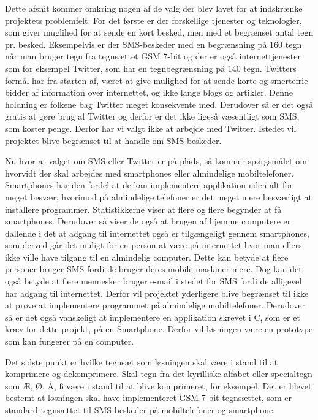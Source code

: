 Dette afsnit kommer omkring nogen af de valg der blev lavet for at indskrænke projektets problemfelt. For det første er der forskellige tjenester og teknologier, som giver muglihed for at sende en kort besked, men med et begrænset antal tegn pr. besked. Eksempelvis er der SMS-beskeder med en begrænsning på 160 tegn når man bruger tegn fra tegnsættet GSM 7-bit\cite{Pro_1} og der er også internettjenester som for eksempel Twitter, som har en tegnbegrænsning på 140 tegn\cite{pro_af1}. Twitters formål har fra starten af, været at give mulighed for at sende korte og smertefrie bidder af information over internettet, og ikke lange blogs og artikler. Denne holdning er folkene bag Twitter meget konsekvente med\cite{pro_af2}. Derudover så er det også gratis at gøre brug af Twitter og derfor er det ikke ligeså væsentligt som SMS, som koster penge. Derfor har vi valgt ikke at arbejde med Twitter. Istedet vil projektet blive begrænset til at handle om SMS-beskeder.

Nu hvor at valget om SMS eller Twitter er på plads, så kommer spørgsmålet om hvorvidt der skal arbejdes med smartphones eller almindelige mobiltelefoner. Smartphones har den fordel at de kan implementere applikation uden alt for meget besvær, hvorimod på almindelige telefoner er det meget mere besværligt at installere programmer. Statistikkerne viser at flere og flere begynder at få smartphones. Derudover så viser de også at brugen af hjemme computere er dallende i det at adgang til internettet også er tilgængeligt gennem smartphones, som derved går det muligt for en person at være på internettet hvor man ellers ikke ville have tilgang til en almindelig computer\cite{pro_af3}. Dette kan betyde at flere personer bruger SMS fordi de bruger deres mobile maskiner mere. Dog kan det også betyde at flere mennesker bruger e-mail i stedet for SMS fordi de alligevel har adgang til internettet. Derfor vil projektet yderligere blive begrænset til ikke at prøve at implementere programmet på almindelige mobiltelefoner. Derudover så er det også vanskeligt at implementere en applikation skrevet i C, som er et kræv for dette projekt, på en Smartphone. Derfor vil løsningen være en prototype som kan fungerer på en computer.

Det sidste punkt er hvilke tegnsæt som løsningen skal være i stand til at komprimere og dekomprimere. Skal tegn fra det kyrilliske alfabet eller specialtegn som Æ, Ø, Å, ß være i stand til at blive komprimeret, for eksempel. Det er blevet bestemt at løsningen skal have implementeret GSM 7-bit  tegnsættet, som er standard tegnsættet til SMS beskeder på mobiltelefoner og smartphone.
